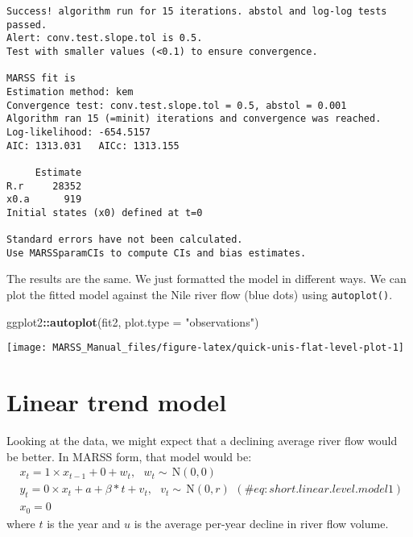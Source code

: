 \documentclass[12pt,]{book}
\newenvironment{Shaded}{\begin{snugshade}}{\end{snugshade}}
\newcommand{\DataTypeTok}[1]{\textcolor[rgb]{0.13,0.29,0.53}{#1}}
\newcommand{\KeywordTok}[1]{\textcolor[rgb]{0.13,0.29,0.53}{\textbf{#1}}}
\newcommand{\NormalTok}[1]{#1}
\newcommand{\OperatorTok}[1]{\textcolor[rgb]{0.81,0.36,0.00}{\textbf{#1}}}
\newcommand{\StringTok}[1]{\textcolor[rgb]{0.31,0.60,0.02}{#1}}
\begin{document}
\begin{verbatim}
Success! algorithm run for 15 iterations. abstol and log-log tests passed.
Alert: conv.test.slope.tol is 0.5.
Test with smaller values (<0.1) to ensure convergence.

MARSS fit is
Estimation method: kem 
Convergence test: conv.test.slope.tol = 0.5, abstol = 0.001
Algorithm ran 15 (=minit) iterations and convergence was reached. 
Log-likelihood: -654.5157 
AIC: 1313.031   AICc: 1313.155   
 
     Estimate
R.r     28352
x0.a      919
Initial states (x0) defined at t=0

Standard errors have not been calculated. 
Use MARSSparamCIs to compute CIs and bias estimates.
\end{verbatim}

The results are the same. We just formatted the model in different ways. We can plot the fitted model against the Nile river flow (blue dots) using \texttt{autoplot()}.

\begin{Shaded}
\begin{Highlighting}[]
\NormalTok{ggplot2}\OperatorTok{::}\KeywordTok{autoplot}\NormalTok{(fit2, }\DataTypeTok{plot.type =} \StringTok{"observations"}\NormalTok{)}
\end{Highlighting}
\end{Shaded}

\begin{center}\texttt{[image: MARSS\_Manual\_files/figure-latex/quick-unis-flat-level-plot-1]} \end{center}

\hypertarget{linear-trend-model}{%
\section{Linear trend model}\label{linear-trend-model}}

Looking at the data, we might expect that a declining average river flow would be better. In MARSS form, that model would be:
\begin{equation}
\begin{gathered}
x_t = 1 \times x_{t-1}+ 0 + w_t,    \text{ } w_t \sim \,\text{N}(0,0) \\
y_t = 0 \times x_t + a + \beta*t + v_t, \text{ } v_t \sim \,\text{N}(0,r)  \\
x_0 = 0 
\end{gathered}   
(\#eq:short.linear.level.model1)
\end{equation}
where \(t\) is the year and \(u\) is the average per-year decline in river flow volume.
\end{document}
